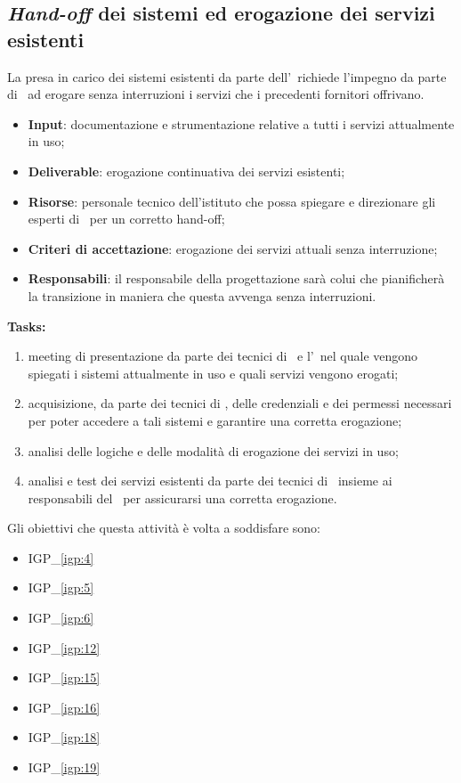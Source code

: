 	\subsection{\textit{Hand-off} dei sistemi ed erogazione dei servizi esistenti}
		
		La presa in carico dei sistemi esistenti da parte dell'\offerente~richiede l'impegno da parte di \azienda~ad erogare senza interruzioni i servizi che i precedenti fornitori offrivano.
		
		\begin{itemize}[noitemsep]
			\renewcommand\labelitemi{--}
			\item \textbf{Input}: documentazione e strumentazione relative a tutti i servizi attualmente in uso;
			\item \textbf{Deliverable}: erogazione continuativa dei servizi esistenti;
			\item \textbf{Risorse}: personale tecnico dell'istituto che possa spiegare e direzionare gli esperti di \azienda~per un corretto hand-off;
			\item \textbf{Criteri di accettazione}: erogazione dei servizi attuali senza interruzione;
			\item \textbf{Responsabili}: il responsabile della progettazione sarà colui che pianificherà la transizione in maniera che questa avvenga senza interruzioni.
		\end{itemize}
		
		\textbf{Tasks:}
		\begin{enumerate}[noitemsep]
			\item meeting di presentazione da parte dei tecnici di \azienda~e l'\istituto~nel quale vengono spiegati i sistemi attualmente in uso e quali servizi vengono erogati;
			\item acquisizione, da parte dei tecnici di \azienda, delle credenziali e dei permessi necessari per poter accedere a tali sistemi e garantire una corretta erogazione;
			\item analisi delle logiche e delle modalità di erogazione dei servizi in uso;
			\item analisi e test dei servizi esistenti da parte dei tecnici di \azienda~insieme ai responsabili del \proponente~per assicurarsi una corretta erogazione.
		\end{enumerate}
	
		Gli obiettivi che questa attività è volta a soddisfare sono:
		\begin{itemize}[noitemsep]
			\renewcommand\labelitemi{--}
			\item {\color{pantone}IGP\_\ref{igp:4}}
			\item {\color{pantone}IGP\_\ref{igp:5}}
			\item {\color{pantone}IGP\_\ref{igp:6}}
			\item {\color{pantone}IGP\_\ref{igp:12}}
			\item {\color{pantone}IGP\_\ref{igp:15}}
			\item {\color{pantone}IGP\_\ref{igp:16}}
			\item {\color{pantone}IGP\_\ref{igp:18}}
			\item {\color{pantone}IGP\_\ref{igp:19}}
		\end{itemize}

